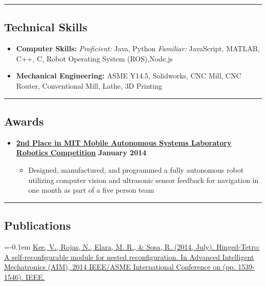 \documentclass[10pt,letterpaper]{article}
\begin{document}
\hrule
\vspace{-0.6em}

\subsection*{Technical Skills}
\begin{itemize}
	\item[]\textbf{Computer Skills:} \emph{Proficient:} Java, Python \emph{Familiar:}  JavaScript, MATLAB, C++, C, Robot Operating System (ROS),Node.js
	\item[]\textbf{Mechanical Engineering:} ASME Y14.5, Solidworks, CNC Mill, CNC Router, Conventional Mill, Lathe, 3D Printing
\end{itemize}

\hrule
\vspace{-0.6em}

\subsection*{Awards}
  \begin{itemize}
    \parskip=-0.1em
    
    \item[]
    {\href{http://maslab.mit.edu/2014/site/index.html}{\textbf{2nd Place in MIT Mobile Autonomous Systems Laboratory Robotics Competition}} \hfill
      \textbf{January 2014}}

    \begin{itemize}[label=\textbullet]
      \itemsep0em
      \item Designed, manufactured, and programmed a fully autonomous robot utilizing computer vision and ultrasonic sensor feedback for navigation in one month as part of a five person team
      \end{itemize}    
\end{itemize}

\hrule
\vspace{-0.6em}

\subsection*{Publications}
    \parskip=-0.1em
{\href{http://ieeexplore.ieee.org/xpls/abs_all.jsp?arnumber=6878302}{Kee, V., Rojas, N., Elara, M. R., \& Sosa, R. (2014, July). Hinged-Tetro: A self-reconfigurable module for nested reconfiguration. In Advanced Intelligent Mechatronics (AIM), 2014 IEEE/ASME International Conference on (pp. 1539-1546). IEEE.}}
\end{document}
